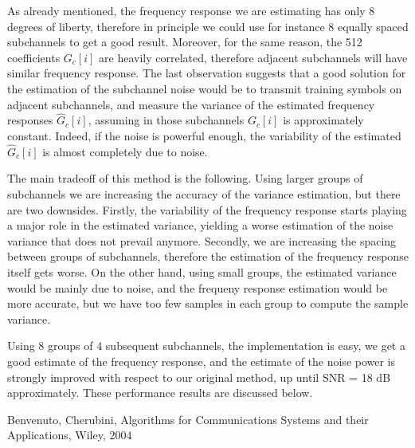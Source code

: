 \documentclass[10pt]{article}
\begin{document}
As already mentioned, the frequency response we are estimating has only 8 degrees of liberty, therefore in principle we could use for instance 8 equally spaced subchannels to get a good result. Moreover, for the same reason, the 512 coefficients $G_c[i]$ are heavily correlated, therefore adjacent subchannels will have similar frequency response. The last observation suggests that a good solution for the estimation of the subchannel noise would be to transmit training symbols on adjacent subchannels, and measure the variance of the estimated frequency responses $\hat{G}_c[i]$, assuming in those subchannels $G_c[i]$ is approximately constant. Indeed, if the noise is powerful enough, the variability of the estimated $\hat{G}_c[i]$ is almost completely due to noise.


The main tradeoff of this method is the following. Using larger groups of subchannels we are increasing the accuracy of the variance estimation, but there are two downsides. Firstly, the variability of the frequency response starts playing a major role in the estimated variance, yielding a worse estimation of the noise variance that does not prevail anymore. Secondly, we are increasing the spacing between groups of subchannels, therefore the estimation of the frequency response itself gets worse. On the other hand, using small groups, the estimated variance would be mainly due to noise, and the frequeny response estimation would be more accurate, but we have too few samples in each group to compute the sample variance.

Using 8 groups of 4 subsequent subchannels, the implementation is easy, we get a good estimate of the frequency response, and the estimate of the noise power is strongly improved with respect to our original method, up until SNR = 18 dB approximately. These performance results are discussed below.


\begin{thebibliography}{10}

Benvenuto, Cherubini, Algorithms for Communications Systems and their Applications, Wiley, 2004

\end{thebibliography}
\end{document}
